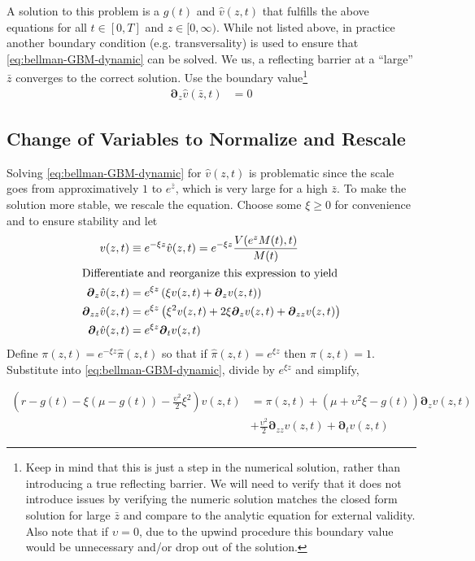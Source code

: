 \documentclass[11pt]{article}
\newcommand{\D}[1][]{\ensuremath{\boldsymbol{\partial}_{#1}}}
\begin{document}
A solution to this problem is a $g(t)$ and $\hat{v}(z,t)$ that fulfills the above equations for all $t\in[0,T]$ and $z\in[0,\infty)$.  While not listed above, in practice another boundary condition (e.g. transversality) is used to ensure that \cref{eq:bellman-GBM-dynamic} can be solved. We us, a reflecting barrier at a ``large'' $\bar{z}$ converges to the correct solution.  Use the boundary value\footnote{Keep in mind that this is just a step in the numerical solution, rather than introducing a true reflecting barrier.  We will need to verify that it does not introduce issues by verifying the numeric solution matches the closed form solution for large $\bar{z}$ and compare to the analytic equation for external validity.  Also note that if $\upsilon = 0$, due to the upwind procedure this boundary value would be unnecessary and/or drop out of the solution.}
	\begin{align}
	\D[z]\hat{v}(\bar{z},t) &= 0\label{eq:reflecting-GBM-dynamic}
	\end{align}


\subsection{Change of Variables to Normalize and Rescale}\label{eq:simple-rescale}
Solving \cref{eq:bellman-GBM-dynamic} for $\hat{v}(z,t)$ is problematic since the scale goes from approximatively $1$ to $e^{\bar{z}}$, which is very large for a high $\bar{z}$.  To make the solution more stable, we rescale the equation.  Choose some $\xi \geq 0$ for convenience and to ensure stability and let
\begin{align}
	v(z,t) &\equiv e^{-\xi z}\hat{v}(z,t) = e^{-\xi z}\frac{V(e^z M(t),t)}{M(t)}\\
	\intertext{Differentiate and reorganize this expression to yield}
	\D[z]\hat{v}(z,t) &= e^{\xi z}\left(\xi v(z,t) + \D[z]v(z,t) \right)\\
	\D[zz]\hat{v}(z,t) &= e^{\xi z}\left(\xi^{2} v(z,t) + 2 \xi\D[z]v(z,t) + \D[zz]v(z,t)  \right)\\
	\D[t]\hat{v}(z,t) &= e^{\xi z} \D[t]v(z,t)
\end{align}
Define $\pi(z,t) = e^{-\xi z}\hat{\pi}(z,t)$ so that if $\hat{\pi}(z,t) = e^{\xi z}$ then $\pi(z,t) = 1$.  Substitute into \cref{eq:bellman-GBM-dynamic}, divide by $e^{\xi z}$ and simplify,

\begin{align}
	\left(r - g(t)- \xi(\mu-g(t)) - \frac{\upsilon^2}{2}\xi^2\right)  v(z,t) &= \pi(z,t) + (\mu+ \upsilon^2\xi - g(t)) \D[z]v(z,t) \nonumber \\ &+ \frac{\upsilon^2}{2} \D[zz]v(z,t) + \D[t]v(z,t)  \label{eq:bellman-GBM-dynamic-normalized}
\end{align}
\end{document}
